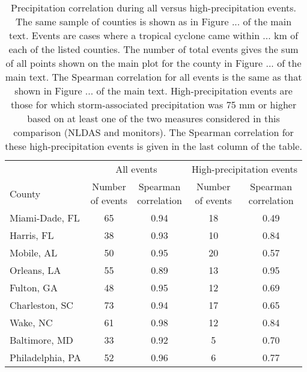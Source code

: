 \begin{table}

\caption{\label{tab:highprecipcorr}Precipitation correlation during all versus high-precipitation events.
                     The same sample of counties is shown as in Figure ... of the main text.
                     Events are cases where a tropical cyclone came within ... km of each of the 
                     listed counties. The number of total events gives the sum of all points
                     shown on the main plot for the county in Figure ... of the main text. 
                     The Spearman correlation for all events is the same as that shown in Figure ...
                     of the main text. High-precipitation events are those for which storm-associated
                     precipitation was 75 mm or higher based on at least one of the two measures
                     considered in this comparison (NLDAS and monitors). The Spearman correlation
                     for these high-precipitation events is given in the last column of the 
                     table.}
\centering
\begin{tabular}[t]{lcccc}
\toprule
\multicolumn{1}{c}{ } & \multicolumn{2}{c}{All events} & \multicolumn{2}{c}{High-precipitation events} \\
\cmidrule(l{3pt}r{3pt}){2-3} \cmidrule(l{3pt}r{3pt}){4-5}
County & \makecell[c]{Number\\of events} & \makecell[c]{Spearman\\correlation} & \makecell[c]{Number\\of events} & \makecell[c]{Spearman\\correlation}\\
\midrule
Miami-Dade, FL & 65 & 0.94 & 18 & 0.49\\
Harris, FL & 38 & 0.93 & 10 & 0.84\\
Mobile, AL & 50 & 0.95 & 20 & 0.57\\
Orleans, LA & 55 & 0.89 & 13 & 0.95\\
Fulton, GA & 48 & 0.95 & 12 & 0.69\\
\addlinespace
Charleston, SC & 73 & 0.94 & 17 & 0.65\\
Wake, NC & 61 & 0.98 & 12 & 0.84\\
Baltimore, MD & 33 & 0.92 & 5 & 0.70\\
Philadelphia, PA & 52 & 0.96 & 6 & 0.77\\
\bottomrule
\end{tabular}
\end{table}
